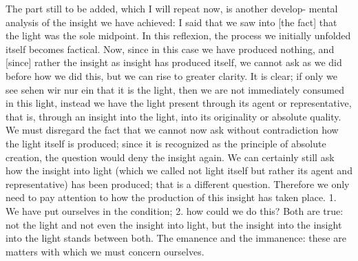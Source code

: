 The part still to be added, which I will repeat now, is another develop-
mental analysis  of the insight we have achieved:
I said that we saw into [the fact] that the light was the sole midpoint.
In this reflexion, the
process we initially unfolded itself becomes factical.
Now, since in this case we
have produced nothing,
and [since] rather the insight as insight has produced itself,
we cannot ask as we did before how we did this, but we can rise to
greater clarity.
It is clear; if only we see {sehen wir nur ein} that it is the light,
then we are not immediately consumed in this light, instead we have the light
present through its agent or representative, that is, through an insight into the
light, into its originality or absolute quality.
We must disregard the fact that
we cannot now ask without contradiction how the light itself is produced;
since it is recognized as the principle of absolute creation, the question would
deny the insight again.
We can certainly still ask how the insight into light
(which we called not light itself but rather its agent and representative) has
been produced; that is a different question.
Therefore we only need to pay
attention to how the production of this insight has taken place.
1. We have put ourselves in the condition;
2. how could we do this?
Both are true:
not the light and not even the insight into light,
but the insight into the insight into the light
stands between both.
The emanence and the immanence:
these are matters with which we must concern ourselves.

